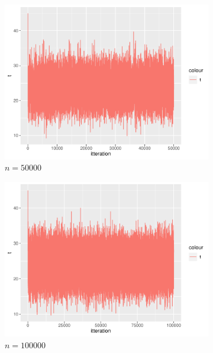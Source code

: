 \begin{figure}[h]
    \centering
    \begin{subfigure}[b]{0.49\textwidth}
        \centering
        \includegraphics[width = \textwidth]{Images/sim_t_50000.pdf}
        \caption{$n = 50000$}
        \label{fig:sim_t_50000}
    \end{subfigure}
    \begin{subfigure}[b]{0.49\textwidth}
        \centering
        \includegraphics[width = \textwidth]{Images/sim_t_100000.pdf}
        \caption{$n = 100000$}
        \label{fig:sim_t_100000}
    \end{subfigure}
    \begin{subfigure}[b]{0.49\textwidth}

\end{subfigure}
\end{figure}
